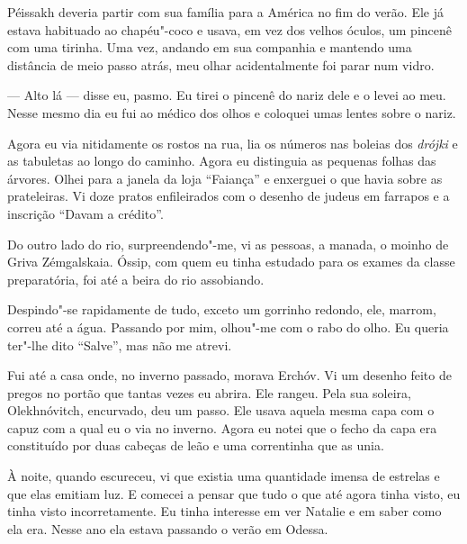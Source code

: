 Péissakh deveria partir com sua família para a América no fim do verão.
Ele já estava habituado ao chapéu"-coco e usava, em vez dos velhos
óculos, um pincenê com uma tirinha. Uma vez, andando em sua companhia e
mantendo uma distância de meio passo atrás, meu olhar acidentalmente foi
parar num vidro.

--- Alto lá --- disse eu, pasmo. Eu tirei o pincenê do nariz dele e o
levei ao meu. Nesse mesmo dia eu fui ao médico dos olhos e coloquei umas
lentes sobre o nariz.

Agora eu via nitidamente os rostos na rua, lia os números nas boleias
dos \emph{drójki} e as tabuletas ao longo do caminho. Agora eu
distinguia as pequenas folhas das árvores. Olhei para a janela da loja
``Faiança'' e enxerguei o que havia sobre as prateleiras. Vi doze pratos
enfileirados com o desenho de judeus em farrapos e a inscrição ``Davam a
crédito''.

Do outro lado do rio, surpreendendo"-me, vi as pessoas, a manada, o
moinho de Griva Zémgalskaia. Óssip, com quem eu tinha estudado para os
exames da classe preparatória, foi até a beira do rio assobiando.

Despindo"-se rapidamente de tudo, exceto um gorrinho redondo, ele,
marrom, correu até a água. Passando por mim, olhou"-me com o rabo do
olho. Eu queria ter"-lhe dito ``Salve'', mas não me atrevi.

Fui até a casa onde, no inverno passado, morava Erchóv. Vi um desenho
feito de pregos no portão que tantas vezes eu abrira. Ele rangeu. Pela
sua soleira, Olekhnóvitch, encurvado, deu um passo. Ele usava aquela
mesma capa com o capuz com a qual eu o via no inverno. Agora eu notei
que o fecho da capa era constituído por duas cabeças de leão e uma
correntinha que as unia.

À noite, quando escureceu, vi que existia uma quantidade imensa de
estrelas e que elas emitiam luz. E comecei a pensar que tudo o que até
agora tinha visto, eu tinha visto incorretamente. Eu tinha interesse em
ver Natalie e em saber como ela era. Nesse ano ela estava passando o
verão em Odessa.
